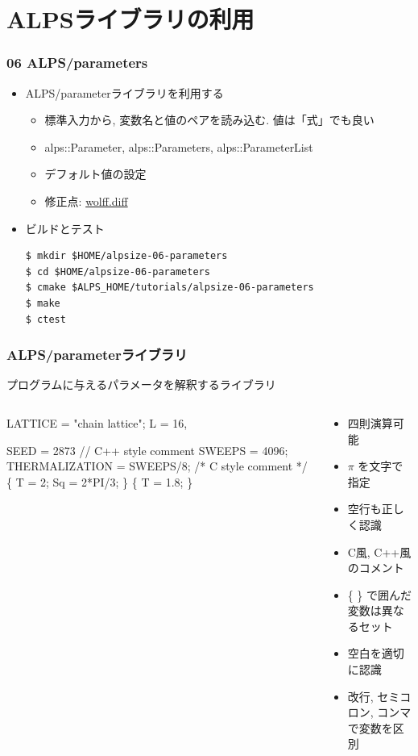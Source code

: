 \section{ALPSライブラリの利用}
\begin{frame}[fragile]
  \frametitle{06 ALPS/parameters}
  \begin{itemize}
    \item ALPS/parameterライブラリを利用する
      \begin{itemize}
        \item 標準入力から, 変数名と値のペアを読み込む. 値は「式」でも良い
        \item alps::Parameter, alps::Parameters, alps::ParameterList
        \item デフォルト値の設定
        \item 修正点: \href{https://github.com/cmsi/alps-tutorial/blob/develop/alpsize/06-wolff.diff}{wolff.diff}
      \end{itemize}
    \item ビルドとテスト
\begin{lstlisting}
$ mkdir $HOME/alpsize-06-parameters
$ cd $HOME/alpsize-06-parameters
$ cmake $ALPS_HOME/tutorials/alpsize-06-parameters
$ make
$ ctest
\end{lstlisting}
  \end{itemize}
\end{frame}

\begin{frame}[fragile]
  \frametitle{ALPS/parameterライブラリ}
  プログラムに与えるパラメータを解釈するライブラリ
  \begin{columns}
    \begin{column}{6cm}
\begin{semiverbatim}
LATTICE = "chain lattice";
L = 16,

SEED = 2873
// C++ style comment
SWEEPS = 4096;
THERMALIZATION = \alert<1>{SWEEPS/8};
/* C style comment */
\{ T = 2; Sq = 2*\alert<2>{PI}/3; \}
\{ T = 1.8; \}
\end{semiverbatim}
    \end{column}
    \begin{column}{6cm}
      \begin{itemize}
      \item 四則演算可能
      \item $\pi$ を文字で指定
      \item 空行も正しく認識
      \item C風, C++風のコメント
      \item \{ \} で囲んだ変数は異なるセット
      \item 空白を適切に認識
      \item 改行, セミコロン, コンマで変数を区別
      \end{itemize}
    \end{column}
  \end{columns}
\end{frame}


